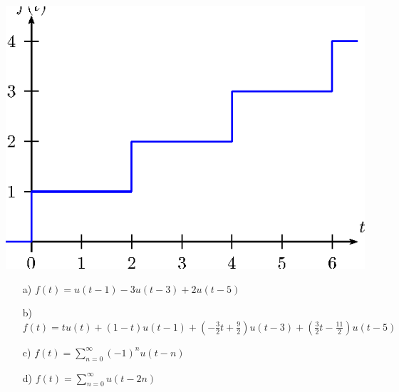 \begin{exer}{\label{ex_Heaviside1}}
\begin{itemize}
\begin{center}
\includegraphics{cap_trans_int/pics/figura_23}\end{center}
\end{itemize}
\end{exer}
\begin{resp}
 \begin{itemize}
  \item[a)] $f(t)=u(t-1)-3u(t-3)+2u(t-5)$
    \item[b)] $f(t)=tu(t)+(1-t)u(t-1)+\left(-\frac{3}{2}t+\frac{9}{2}\right)u(t-3)+\left(\frac{3}{2}t-\frac{11}{2}\right)u(t-5)$
        \item[c)] $f(t)=\sum_{n=0}^\infty (-1)^n u(t-n)$
        \item[d)] $f(t)=\sum_{n=0}^\infty  u(t-2n)$ 
 \end{itemize}
\end{resp}

